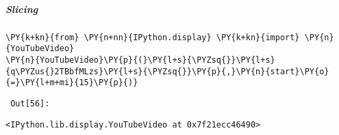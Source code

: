     \subparagraph{Slicing}



{\par%
\vspace{-1\baselineskip}%
}%
\begin{notebookcell}[56]%
\begin{addmargin}[\cellleftmargin]{0em}%
{\smaller%
\par%
%
\vspace{-1\smallerfontscale}%
\begin{Verbatim}[commandchars=\\\{\}]
\PY{k+kn}{from} \PY{n+nn}{IPython.display} \PY{k+kn}{import} \PY{n}{YouTubeVideo}
\PY{n}{YouTubeVideo}\PY{p}{(}\PY{l+s}{\PYZsq{}}\PY{l+s}{q\PYZus{}2TBbfMLzs}\PY{l+s}{\PYZsq{}}\PY{p}{,}\PY{n}{start}\PY{o}{=}\PY{l+m+mi}{15}\PY{p}{)}
\end{Verbatim}
%
\par%
\vspace{-1\smallerfontscale}}%
\end{addmargin}
\end{notebookcell}

\par\vspace{1\smallerfontscale}%
    
        {\par%
        \vspace{-1\smallerfontscale}%
        \noindent%
        \begin{minipage}{\cellleftmargin}%
    \hfill%
    {\smaller%
    \tt%
    \color{nbframe-out-prompt}%
    Out[56]:}%
    \hspace{\inputpadding}%
    \hspace{0em}%
    \hspace{3pt}%
    \end{minipage}%
        }%
    \begin{addmargin}[\cellleftmargin]{0em}%
    {\smaller%
    \vspace{-1\smallerfontscale}%
    
    
    
    \begin{verbatim}
<IPython.lib.display.YouTubeVideo at 0x7f21ecc46490>
    \end{verbatim}

    
}%
    \end{addmargin}%

